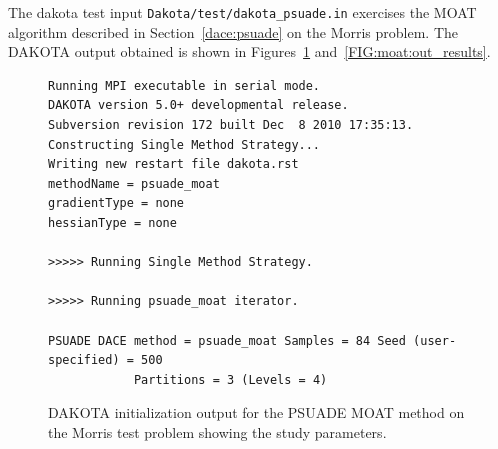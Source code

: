 The dakota test input {\tt Dakota/test/dakota\_psuade.in} exercises
the MOAT algorithm described in Section~\ref{dace:psuade} on the
Morris problem.  The DAKOTA output obtained is shown in
Figures~\ref{FIG:moat:out_preamble} and~\ref{FIG:moat:out_results}.
\begin{figure}[ht!]
\centering
\begin{bigbox}
\begin{small}
\begin{verbatim}
Running MPI executable in serial mode.
DAKOTA version 5.0+ developmental release.
Subversion revision 172 built Dec  8 2010 17:35:13.
Constructing Single Method Strategy...
Writing new restart file dakota.rst
methodName = psuade_moat
gradientType = none
hessianType = none

>>>>> Running Single Method Strategy.

>>>>> Running psuade_moat iterator.

PSUADE DACE method = psuade_moat Samples = 84 Seed (user-specified) = 500
            Partitions = 3 (Levels = 4)
\end{verbatim}
\end{small}
\end{bigbox}
\caption[DAKOTA initialization output for PSUADE
MOAT.]{\label{FIG:moat:out_preamble} DAKOTA initialization output for
the PSUADE MOAT method on the Morris test problem showing the study
parameters.}
\end{figure}
